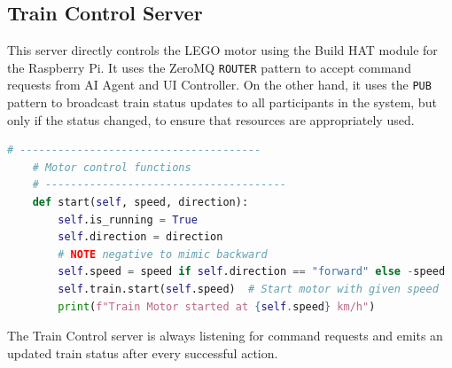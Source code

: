 \subsection{Train Control Server}

This server directly controls the LEGO motor using the Build HAT module for the Raspberry Pi. It uses the ZeroMQ \texttt{ROUTER} pattern to accept command requests from AI Agent and UI Controller. On the other hand, it uses the \texttt{PUB} pattern to broadcast train status updates to all participants in the system, but only if the status changed, to ensure that resources are appropriately used. 

\begin{lstlisting}[language=Python, caption=Motor control functions]
    # --------------------------------------
    # Motor control functions
    # --------------------------------------
    def start(self, speed, direction):
        self.is_running = True
        self.direction = direction
        # NOTE negative to mimic backward
        self.speed = speed if self.direction == "forward" else -speed 
        self.train.start(self.speed)  # Start motor with given speed
        print(f"Train Motor started at {self.speed} km/h")

\end{lstlisting}


The Train Control server is always listening for command requests and emits an updated train status after every successful action.

